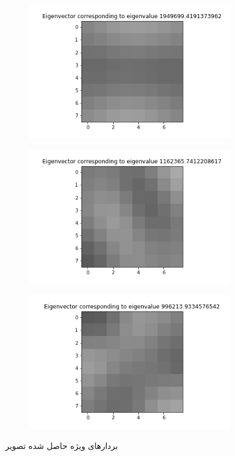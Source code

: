 \documentclass{article}
\begin{document}
\begin{figure}[h]
\begin{subfigure}{0.2\linewidth}
    \end{subfigure}
    \hfill
    \begin{subfigure}{0.2\linewidth}
        \centering
        \includegraphics[scale=0.2]{images/q4/donald/eigenvector5.png}
    \end{subfigure}
    \hfill
    \begin{subfigure}{0.2\linewidth}
        \centering
        \includegraphics[scale=0.2]{images/q4/donald/eigenvector6.png}
    \end{subfigure}
    \hfill
    \begin{subfigure}{0.2\linewidth}
        \centering
        \includegraphics[scale=0.2]{images/q4/donald/eigenvector7.png}
    \end{subfigure}
    \caption{بردار‌های ویژه حاصل شده تصویر }
    \label{donald_eigen}
\end{figure}
\end{document}
